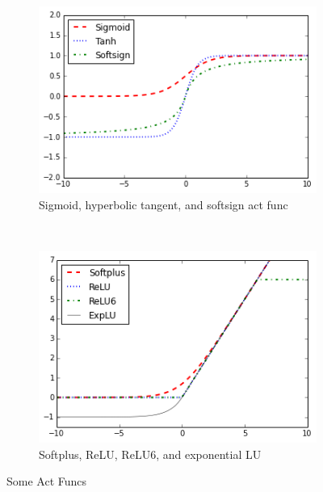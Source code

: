 \documentclass[twoside]{article}
\begin{document}
\begin{figure}[H]
    \centering
    \begin{subfigure}[b]{0.4\textwidth}
        \includegraphics[width=\textwidth]{images/d2167d3b-96f9-46d1-87c4-79d0839b3745.png}
        \caption{Sigmoid, hyperbolic tangent, and softsign act func}
    \end{subfigure}
    \qquad
    ~ %
    \begin{subfigure}[b]{0.4\textwidth}
        \includegraphics[width=\textwidth]{images/2a1256eb-1993-4e62-a561-48577ebcfec2.png}
        \caption{Softplus, ReLU, ReLU6, and exponential LU}
    \end{subfigure}
    \caption{Some Act Funcs}
\end{figure}
\end{document}
